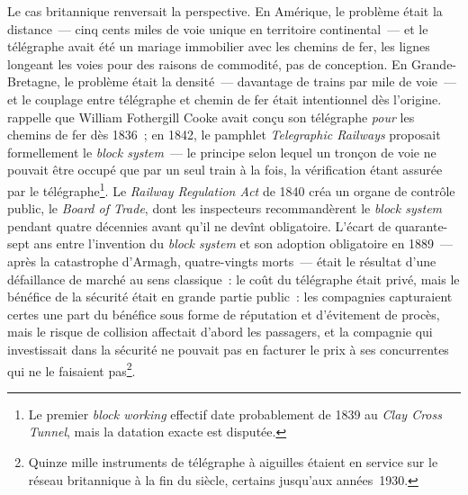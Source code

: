 Le cas britannique renversait la perspective. En Amérique, le problème était la distance~--- cinq cents miles de voie unique en territoire continental~--- et le télégraphe avait été un \og mariage immobilier\fg{} avec les chemins de fer, les lignes longeant les voies pour des raisons de commodité, pas de conception. En Grande-Bretagne, le problème était la densité~--- davantage de trains par mile de voie~--- et le couplage entre télégraphe et chemin de fer était intentionnel dès l'origine. \textcite{hubbard_cooke_1965} rappelle que William Fothergill Cooke avait conçu son télégraphe \emph{pour} les chemins de fer dès 1836~; en 1842, le pamphlet \emph{Telegraphic Railways} proposait formellement le \emph{block system}~--- le principe selon lequel un tronçon de voie ne pouvait être occupé que par un seul train à la fois, la vérification étant assurée par le télégraphe\footnote{Le premier \emph{block working} effectif date probablement de 1839 au \emph{Clay Cross Tunnel}, mais la datation exacte est disputée.}. Le \emph{Railway Regulation Act} de 1840 créa un organe de contrôle public, le \emph{Board of Trade}, dont les inspecteurs recommandèrent le \emph{block system} pendant quatre décennies avant qu'il ne devînt obligatoire. L'écart de quarante-sept ans entre l'invention du \emph{block system} et son adoption obligatoire en 1889~--- après la catastrophe d'Armagh, quatre-vingts morts~--- était le résultat d'une défaillance de marché au sens classique~: %
le coût du télégraphe était privé, mais le bénéfice de la sécurité était en grande partie public~: les compagnies capturaient certes une part du bénéfice sous forme de réputation et d'évitement de procès, mais le risque de collision affectait d'abord les passagers, et la compagnie qui investissait dans la sécurité ne pouvait pas en facturer le prix à ses concurrentes qui ne le faisaient pas\footnote{Quinze mille instruments de télégraphe à aiguilles étaient en service sur le réseau britannique à la fin du siècle, certains jusqu'aux années~1930.}.

